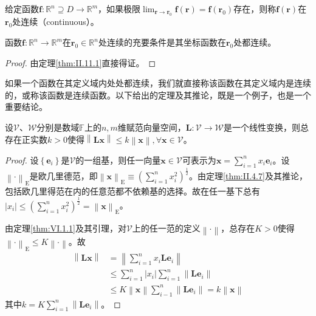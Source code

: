 \documentclass[main.tex]{subfiles}
\begin{document}
\begin{definition}[函数的连续性]\label{II.11.2}
给定函数$\mathbf{f}:\mathbb{R}^n\supseteq D\rightarrow\mathbb{R}^m$，如果极限$\lim_{\mathbf{r}\to\mathbf{r}_0}\mathbf{f}\left(\mathbf{r}\right)=\mathbf{f}\left(\mathbf{r}_0\right)$存在，则称$\mathbf{f}\left(\mathbf{r}\right)$在$\mathbf{r}_0$处连续（continuous）。
\end{definition}

\begin{theorem}\label{thm:II.11.2}
函数$\mathbf{f}:\mathbb{R}^n\rightarrow\mathbb{R}^m$在$\mathbf{r}_0\in\mathbb{R}^n$处连续的充要条件是其坐标函数在$\mathbf{r}_0$处都连续。
\end{theorem}
\begin{proof}
由定理\ref{thm:II.11.1}直接得证。
\end{proof}

如果一个函数在其定义域内处处都连续，我们就直接称该函数在其定义域内是连续的，或称该函数是连续函数。以下给出的定理及其推论，既是一个例子，也是一个重要结论。

\begin{theorem}\label{thm:II.11.3}
设$\mathcal{V}$、$\mathcal{W}$分别是数域$\mathbb{F}$上的$n,m$维赋范向量空间，$\mathbf{L}:\mathcal{V}\rightarrow\mathcal{W}$是一个线性变换，则总存在正实数$k>0$使得$\left\|\mathbf{Lx}\right\|\leq k\left\|\mathbf{x}\right\|,\forall\mathbf{x}\in\mathcal{V}$。
\end{theorem}
\begin{proof}
设$\left\{\mathbf{e}_i\right\}$是$\mathcal{V}$的一组基，则任一向量$\mathbf{x}\in\mathcal{V}$可表示为$\mathbf{x}=\sum_{i=1}^nx_i\mathbf{e}_i$。设$\left\|\cdot\right\|_\mathrm{E}$是欧几里德范，即$\left\|\mathbf{x}\right\|_\mathrm{E}\equiv\left(\sum_{i=1}^nx_i^2\right)^\frac{1}{2}$。由定理\ref{thm:II.4.7}及其推论，包括欧几里得范在内的任意范都不依赖基的选择。故在任一基下总有$\left|x_i\right|\leq\left(\sum_{i=1}^nx_i^2\right)^\frac{1}{2}=\left\|\mathbf{x}\right\|_\mathrm{E}$。

由定理\ref{thm:VI.1.1}及其引理，对$\mathcal{V}$上的任一范的定义$\left\|\cdot\right\|$，总存在$K>0$使得$\left\|\cdot\right\|_\mathrm{E}\leq K\left\|\cdot\right\|$。故
\begin{align*}
    \left\|\mathbf{Lx}\right\|&=\left\|\sum_{i=1}^nx_i\mathbf{Le}_i\right\|\\
    &\leq\sum_{i=1}^n\left|x_i\right|\sum_{i=1}^n\left\|\mathbf{Le}_i\right\|\\
    &\leq K\left\|\mathbf{x}\right\|\sum_{i-1}^n\left\|\mathbf{Le}_i\right\|=k\left\|\mathbf{x}\right\|
\end{align*}
其中$k=K\sum_{i=1}^n\left\|\mathbf{Le}_i\right\|$。
\end{proof}
\end{document}
